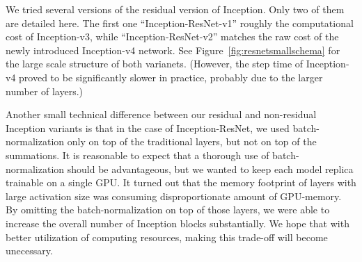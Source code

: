 \documentclass[10pt,twocolumn,letterpaper]{article}
\begin{document}
We tried several versions of the residual version of Inception. Only two
of them are detailed here. The first one ``Inception-ResNet-v1''
roughly the computational cost of Inception-v3, while ``Inception-ResNet-v2''
matches the raw cost of the newly introduced Inception-v4 network. See
Figure~\ref{fig:resnetsmallschema} for the large scale structure of both
varianets. (However, the step time of Inception-v4 proved to be significantly
slower in practice, probably due to the larger number of layers.)

Another small technical difference between our residual and non-residual
Inception variants is that in the case of Inception-ResNet,
we used batch-normalization only on top of the traditional layers, but not
on top of the summations. It is reasonable to expect that a thorough use
of batch-normalization should be advantageous, but we wanted to keep
each model replica trainable on a single GPU. It turned out that the
memory footprint of layers with large activation size was consuming
disproportionate amount of GPU-memory. By omitting the batch-normalization
on top of those layers, we were able to increase the overall number of
Inception blocks substantially. We hope that with better utilization of
computing resources, making this trade-off will become unecessary.
\end{document}
